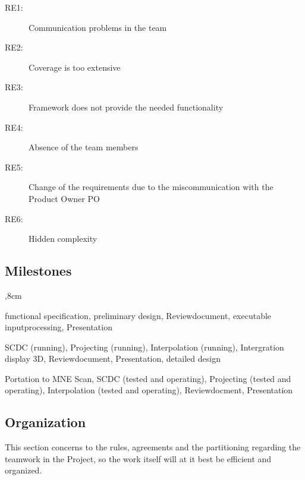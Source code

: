 \begin{description}
	\item[RE1:] Communication problems in the team
	\item[RE2:] Coverage is too extensive
	\item[RE3:] Framework does not provide the needed functionality 
	\item[RE4:] Absence of the team members 
	\item[RE5:] Change of the requirements due to the miscommunication with the Product Owner PO
	\item[RE6:] Hidden complexity 
 \end{description}

\clearpage

\subsection{Milestones}
\begin{description}
	,8cm
	\item[First Milestone:] functional specification, preliminary design, Reviewdocument, executable inputprocessing, Presentation 
	
	\item[Second Milestone:] SCDC (running), Projecting (running), Interpolation (running), Intergration display 3D, Reviewdocument, Presentation, detailed design
	
	\item[Third Milenstone:] Portation to MNE Scan, SCDC (tested and operating), Projecting (tested and operating), Interpolation (tested and operating), Reviewdocment, Presentation
\end{description}



\subsection{Organization}

This section concerns to the rules, agreements and the partitioning regarding the teamwork in the Project, so the work itself will at it best be efficient and organized. 


